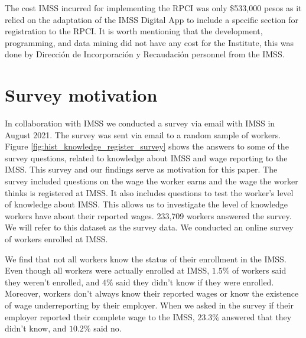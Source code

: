 \documentclass[oneside,11pt]{article}
\begin{document}


The cost IMSS incurred for implementing the RPCI was only \$533,000 pesos as it relied on the adaptation of the IMSS Digital App to include a specific section for registration to the RPCI. It is worth mentioning that the development, programming, and data mining did not have any cost for the Institute, this was done by Dirección de Incorporación y Recaudación personnel from the IMSS.

\section{Survey motivation}

In collaboration with IMSS we conducted a survey via email with IMSS in August 2021. The survey was sent via email to a random sample of workers. Figure \ref{fig:hist_knowledge_register_survey} shows the answers to some of the survey questions, related to knowledge about IMSS and wage reporting to the IMSS. This survey and our findings serve as motivation for this paper.  The survey included questions on the wage the worker earns and the wage the worker thinks is registered at IMSS. It also includes questions to test the worker's level of knowledge about IMSS. This allows us to investigate the level of knowledge workers have about their reported wages. 233,709 workers answered the survey. We will refer to this dataset as the survey data. 
We conducted an online survey of workers enrolled at IMSS. 

We find that not all workers know the status of their enrollment in the IMSS. Even though all workers were actually enrolled at IMSS, $1.5\%$ of workers said they weren't enrolled, and $4\%$ said they didn't know if they were enrolled. Moreover, workers don't always know their reported wages or know the existence of wage underreporting by their employer. When we asked in the survey if their employer reported their complete wage to the IMSS, $23.3\%$ answered that they didn't know, and $10.2\%$ said no.
\end{document}
